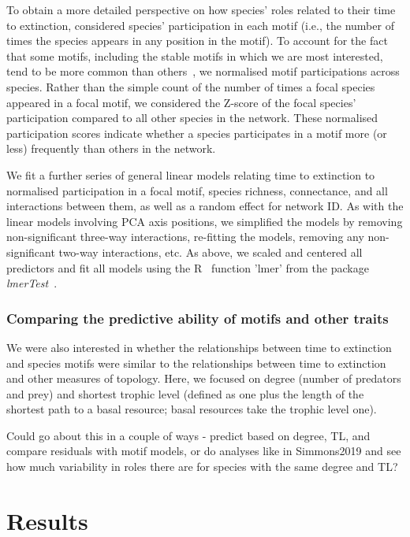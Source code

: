 \documentclass[12pt]{article}
\begin{document}
			To obtain a more detailed perspective on how species' roles related to their time to extinction, considered species' participation in each motif (i.e., the number of times the species appears in any position in the motif). To account for the fact that some motifs, including the stable motifs in which we are most interested, tend to be more common than others~\citep{Stouffer2007}, we normalised motif participations across species. Rather than the simple count of the number of times a focal species appeared in a focal motif, we considered the Z-score of the focal species' participation compared to all other species in the network. These normalised participation scores indicate whether a species participates in a motif more (or less) frequently than others in the network.


			We fit a further series of general linear models relating time to extinction to normalised participation in a focal motif, species richness, connectance, and all interactions between them, as well as a random effect for network ID. As with the linear models involving PCA axis positions, we simplified the models by removing non-significant three-way interactions, re-fitting the models, removing any non-significant two-way interactions, etc. As above, we scaled and centered all predictors and fit all models using the R~\citep{R} function 'lmer' from the package \emph{lmerTest}~\citep{lmerTest}.


		\subsubsection*{Comparing the predictive ability of motifs and other traits}

			We were also interested in whether the relationships between time to extinction and species motifs were similar to the relationships between time to extinction and other measures of topology. Here, we focused on degree (number of predators and prey) and shortest trophic level (defined as one plus the length of the shortest path to a basal resource; basal resources take the trophic level one). 


			Could go about this in a couple of ways - predict based on degree, TL, and compare residuals with motif models, or do analyses like in Simmons2019 and see how much variability in roles there are for species with the same degree and TL?


\section*{Results}
\end{document}
